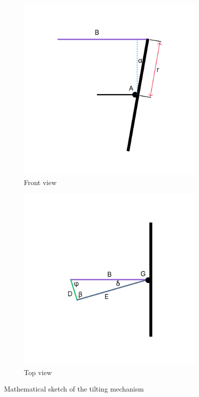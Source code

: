 %
\begin{figure}[ht]
  \begin{subfigure}[b]{0.49\textwidth}
    \includegraphics[width=\textwidth]{src/assets/pictures/construction/math_front.png}
    \caption{Front view}
    \label{fig:const:tilt:math_front}
  \end{subfigure}
  \hfill
  \begin{subfigure}[b]{0.49\textwidth}
    \includegraphics[width=\textwidth]{src/assets/pictures/construction/math_top.png}
    \caption{Top view}
    \label{fig:const:tilt:math_top}
  \end{subfigure}
  \caption{Mathematical sketch of the tilting mechanism}
  \label{fig:const:tilt:math}
\end{figure}
